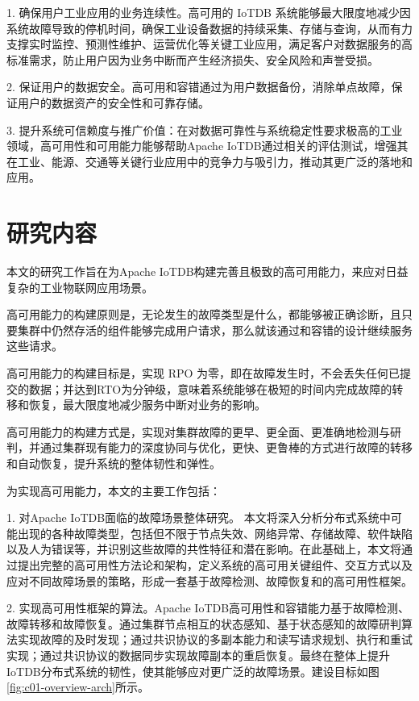 1. 确保用户工业应用的业务连续性。高可用的 IoTDB 系统能够最大限度地减少因系统故障导致的停机时间，确保工业设备数据的持续采集、存储与查询，从而有力支撑实时监控、预测性维护、运营优化等关键工业应用，满足客户对数据服务的高标准需求，防止用户因为业务中断而产生经济损失、安全风险和声誉受损。

2. 保证用户的数据安全。高可用和容错通过为用户数据备份，消除单点故障，保证用户的数据资产的安全性和可靠存储。

3. 提升系统可信赖度与推广价值：在对数据可靠性与系统稳定性要求极高的工业领域，高可用性和可用能力能够帮助Apache IoTDB通过相关的评估测试，增强其在工业、能源、交通等关键行业应用中的竞争力与吸引力，推动其更广泛的落地和应用。



\section{研究内容}


本文的研究工作旨在为Apache IoTDB构建完善且极致的高可用能力，来应对日益复杂的工业物联网应用场景。

高可用能力的构建原则是，无论发生的故障类型是什么，都能够被正确诊断，且只要集群中仍然存活的组件能够完成用户请求，那么就该通过\failover 和容错的设计继续服务这些请求。

高可用能力的构建目标是，实现 RPO 为零，即在故障发生时，不会丢失任何已提交的数据；并达到RTO为分钟级，意味着系统能够在极短的时间内完成故障的转移和恢复，最大限度地减少服务中断对业务的影响。

高可用能力的构建方式是，实现对集群故障的更早、更全面、更准确地检测与研判，并通过集群现有能力的深度协同与优化，更快、更鲁棒的方式进行故障的转移和自动恢复，提升系统的整体韧性和弹性。

为实现高可用能力，本文的主要工作包括：

1. 对Apache IoTDB面临的故障场景整体研究。
本文将深入分析分布式系统中可能出现的各种故障类型，包括但不限于节点失效、网络异常、存储故障、软件缺陷以及人为错误等，并识别这些故障的共性特征和潜在影响。在此基础上，本文将通过提出完整的高可用性方法论和架构，定义系统的高可用关键组件、交互方式以及应对不同故障场景的策略，形成一套基于故障检测、故障恢复和\failover 的高可用性框架。

2. 实现高可用性框架的算法。Apache IoTDB高可用性和容错能力基于故障检测、故障转移和故障恢复。通过集群节点相互的状态感知、基于状态感知的故障研判算法实现故障的及时发现；通过共识协议的多副本能力和读写请求规划、执行和重试实现\failover；通过共识协议的数据同步实现故障副本的重启恢复。最终在整体上提升IoTDB分布式系统的韧性，使其能够应对更广泛的故障场景。建设目标如图\ref{fig:c01-overview-arch}所示。


